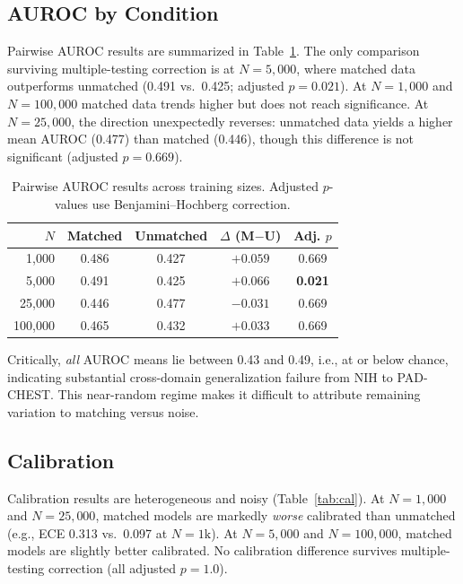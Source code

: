\documentclass[11pt]{article}
\begin{document}
\subsection{AUROC by Condition}

Pairwise AUROC results are summarized in Table~\ref{tab:auroc}. The only comparison surviving multiple-testing correction is at $N=5{,}000$, where matched data outperforms unmatched (0.491 vs.\ 0.425; adjusted $p = 0.021$). At $N=1{,}000$ and $N=100{,}000$ matched data trends higher but does not reach significance. At $N=25{,}000$, the direction unexpectedly reverses: unmatched data yields a higher mean AUROC (0.477) than matched (0.446), though this difference is not significant (adjusted $p = 0.669$).

\begin{table}[h]
\centering
\caption{Pairwise AUROC results across training sizes. Adjusted $p$-values use Benjamini--Hochberg correction.}
\label{tab:auroc}
\begin{tabular}{rcccc}
\toprule
$N$ & Matched & Unmatched & $\Delta$ (M$-$U) & Adj. $p$ \\
\midrule
1{,}000   & 0.486 & 0.427 & $+0.059$ & 0.669 \\
5{,}000   & 0.491 & 0.425 & $+0.066$ & \textbf{0.021} \\
25{,}000  & 0.446 & 0.477 & $-0.031$ & 0.669 \\
100{,}000 & 0.465 & 0.432 & $+0.033$ & 0.669 \\
\bottomrule
\end{tabular}
\end{table}

Critically, \emph{all} AUROC means lie between 0.43 and 0.49, i.e., at or below chance, indicating substantial cross-domain generalization failure from NIH to PAD-CHEST. This near-random regime makes it difficult to attribute remaining variation to matching versus noise.

\subsection{Calibration}

Calibration results are heterogeneous and noisy (Table~\ref{tab:cal}). At $N=1{,}000$ and $N=25{,}000$, matched models are markedly \emph{worse} calibrated than unmatched (e.g., ECE 0.313 vs.\ 0.097 at $N=1\text{k}$). At $N=5{,}000$ and $N=100{,}000$, matched models are slightly better calibrated. No calibration difference survives multiple-testing correction (all adjusted $p = 1.0$).
\end{document}

